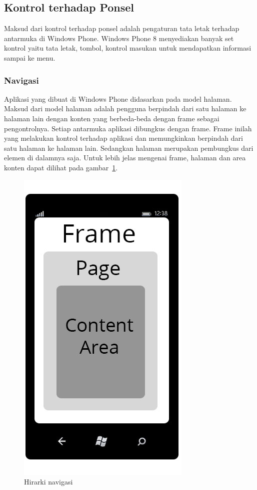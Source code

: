 \subsection{Kontrol terhadap Ponsel}
\label{subsec:Kontrol terhadap Ponsel}
\hspace{0.5cm} Maksud dari kontrol terhadap ponsel adalah pengaturan tata letak terhadap antarmuka di Windows Phone. Windows Phone 8 menyediakan banyak set kontrol yaitu tata letak, tombol, kontrol masukan untuk mendapatkan informasi sampai ke menu. 

\subsubsection{Navigasi}
\label{subsubsec:Navigasi}
\hspace{0.5cm} Aplikasi yang dibuat di Windows Phone didasarkan pada model halaman. Maksud dari model halaman adalah pengguna berpindah dari satu halaman ke halaman lain dengan konten yang berbeda-beda dengan frame sebagai pengontrolnya. Setiap antarmuka aplikasi dibungkus dengan frame. Frame inilah yang melakukan kontrol terhadap aplikasi dan memungkinkan berpindah dari satu halaman ke halaman lain. Sedangkan halaman merupakan pembungkus dari elemen di dalamnya saja. Untuk lebih jelas mengenai frame, halaman dan area konten dapat dilihat pada gambar~\ref{fig:nav_hierarchy}.

\begin{figure}[h]
	\centering
		\includegraphics[scale=0.5]{Gambar/nav_hierarchy}
	\caption{Hirarki navigasi}
	\label{fig:nav_hierarchy}
\end{figure}


